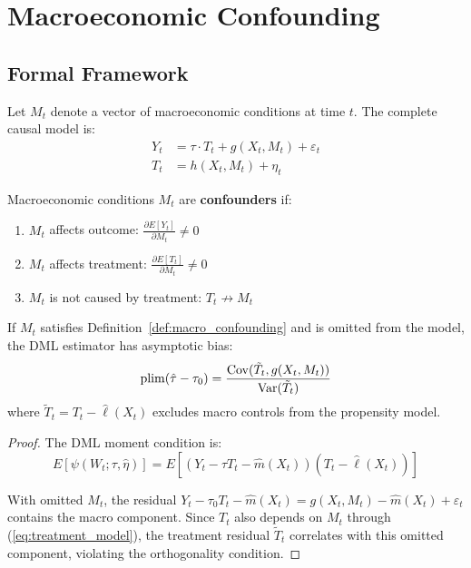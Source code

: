 \section{Macroeconomic Confounding}\label{sec:macro_confounding}

\subsection{Formal Framework}

Let $M_t$ denote a vector of macroeconomic conditions at time $t$. The complete causal model is:
\begin{align}
Y_t &= \tau \cdot T_t + g(X_t, M_t) + \varepsilon_t \label{eq:full_model} \\
T_t &= h(X_t, M_t) + \eta_t \label{eq:treatment_model}
\end{align}

\begin{definition}
\label{def:macro_confounding}
Macroeconomic conditions $M_t$ are \textbf{confounders} if:
\begin{enumerate}
    \item $M_t$ affects outcome: $\frac{\partial E[Y_t]}{\partial M_t} \neq 0$
    \item $M_t$ affects treatment: $\frac{\partial E[T_t]}{\partial M_t} \neq 0$
    \item $M_t$ is not caused by treatment: $T_t \not\to M_t$
\end{enumerate}
\end{definition}

\begin{theorem}
\label{thm:omitted_macro}
If $M_t$ satisfies Definition~\ref{def:macro_confounding} and is omitted from the model, the DML estimator has asymptotic bias:
\begin{equation}
\operatorname*{plim}(\hat{\tau} - \tau_0) = \frac{\mathrm{Cov}(\tilde{T}_t, g(X_t, M_t))}{\mathrm{Var}(\tilde{T}_t)}
\end{equation}
where $\tilde{T}_t = T_t - \hat{\ell}(X_t)$ excludes macro controls from the propensity model.
\end{theorem}

\begin{proof}
The DML moment condition is:
\[
E[\psi(W_t; \tau, \hat{\eta})] = E[(Y_t - \tau T_t - \hat{m}(X_t))(T_t - \hat{\ell}(X_t))]
\]

With omitted $M_t$, the residual $Y_t - \tau_0 T_t - \hat{m}(X_t) = g(X_t, M_t) - \hat{m}(X_t) + \varepsilon_t$ contains the macro component. Since $T_t$ also depends on $M_t$ through (\ref{eq:treatment_model}), the treatment residual $\tilde{T}_t$ correlates with this omitted component, violating the orthogonality condition.
\end{proof}

